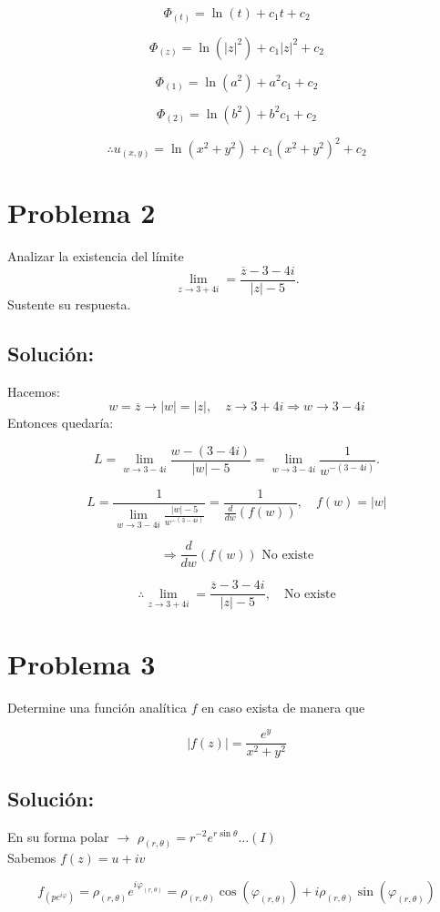 \documentclass[a4paper,12pt]{article}
\begin{document}
\[
\Phi_{(t)} = \ln(t) + c_1 t + c_2
\]

\[
\Phi_{(z)} = \ln(|z|^2) + c_1 |z|^2 + c_2
\]

\[
\Phi_{(1)} = \ln(a^2) + a^2 c_1 + c_2
\]

\[
\Phi_{(2)} = \ln(b^2) + b^2 c_1 + c_2
\]

\[
\therefore u_{(x,y)} = \ln(x^2 + y^2) + c_1 (x^2 + y^2)^2 + c_2
\]

\section*{Problema 2}
Analizar la existencia del límite  
\[
\lim_{z \to 3+4i} = \frac{\overline{z} - 3 - 4i}{|z| - 5}.
\]  
Sustente su respuesta.

\subsection*{Solución:}
Hacemos:  
\[
w = \overline{z} \rightarrow |w| = |z|, \quad z \to 3 + 4i \Rightarrow w \to 3 - 4i
\]  
Entonces quedaría:  

\[
L = \lim_{w \to 3-4i} \frac{w - (3 - 4i)}{|w| - 5} = \lim_{w \to 3-4i} \frac{1}{w^{-(3-4i)}}.
\]

\[
L = \frac{1}{\lim_{w \to 3-4i} \frac{|w| - 5}{w^{-(3-4i)}}} = \frac{1}{\frac{d}{dw}(f(w))}, \quad f(w) = |w|
\]

\[
\Rightarrow \frac{d}{dw}(f(w)) \text{ No existe}
\]

\[
\therefore \lim_{z \to 3+4i} = \frac{\overline{z} - 3 - 4i}{|z| - 5}, \quad \text{No existe}
\]

\section*{Problema 3}
Determine una función analítica \( f \) en caso exista de manera que

\[
|f(z)| = \frac{e^y}{x^2 + y^2}
\]

\subsection*{Solución:}
En su forma polar \(\rightarrow\) \(\rho_{(r,\theta)} = r^{-2}e^{r \sin \theta} \ldots (I) \)\\

Sabemos \( f(z) = u + iv \)

\[
f_{(pe^{i\varphi})} = \rho_{(r,\theta)} e^{i\varphi_{(r,\theta)}} = \rho_{(r,\theta)} \cos(\varphi_{(r,\theta)}) + i \rho_{(r,\theta)} \sin(\varphi_{(r,\theta)})
\]
\end{document}
